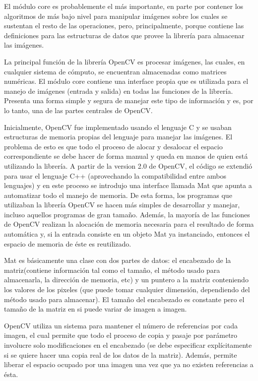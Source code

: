 \documentclass[a4paper,10pt]{report}
\begin{document}
El módulo core es probablemente el más importante, en parte por contener los algoritmos de más bajo nivel para manipular imágenes sobre los cuales se sustentan el resto de las operaciones, pero, principalmente, porque 
contiene las definiciones para las estructuras de datos que provee la librería para almacenar las imágenes.

La principal función de la librería OpenCV es procesar imágenes, las cuales, en cualquier sistema de cómputo, se encuentran almacenadas como matrices numéricas. 
El módulo core contiene una interface propia que es utilizada para el manejo de imágenes (entrada y salida) en todas las funciones de la librería. 
Presenta una forma simple y segura de manejar este tipo de información y es, por lo tanto, una de las partes centrales de OpenCV.

Inicialmente, OpenCV fue implementado usando el lenguaje C y se usaban estructuras de memoria propias del lenguaje para manejar las imágenes. 
El problema de esto es que todo el proceso de alocar y desalocar el espacio correspondiente se debe hacer de forma manual y queda en manos de quien está utilizando la librería. 
A partir de la version 2.0 de OpenCV, el código se extendió para usar el lenguaje C++ (aprovechando la compatibilidad entre ambos lenguajes) y en este proceso se introdujo una interface llamada Mat que apunta a automatizar todo el manejo de memoria. 
De esta forma, los programas que utilizaban la librería OpenCV se hacen más simples de desarrollar y manejar, incluso aquellos programas de gran tamaño.
Además, la mayoría de las funciones de OpenCV realizan la alocación de memoria necesaria para el resultado de forma automática y, si la entrada consiste en un objeto Mat ya instanciado, entonces el espacio de memoria de éste es reutilizado.

Mat es básicamente una clase con dos partes de datos: el encabezado de la matriz(contiene información tal como el tamaño, el método usado para almacenarla, la dirección de memoria, etc) y un puntero a la matriz conteniendo los valores de los pixeles (que puede tomar cualquier dimensión, dependiendo del método usado para almacenar).
El tamaño del encabezado es constante pero el tamaño de la matriz en si puede variar de imagen a imagen.

OpenCV utiliza un sistema para mantener el número de referencias por cada imagen, el cual permite que todo el proceso de copia y pasaje por parámetro involucre solo modificaciones en el encabezado (se debe especificar explícitamente si se quiere hacer una copia real de los datos de la matriz).
Además, permite liberar el espacio ocupado por una imagen una vez que ya no existen referencias a ésta.
\end{document}
